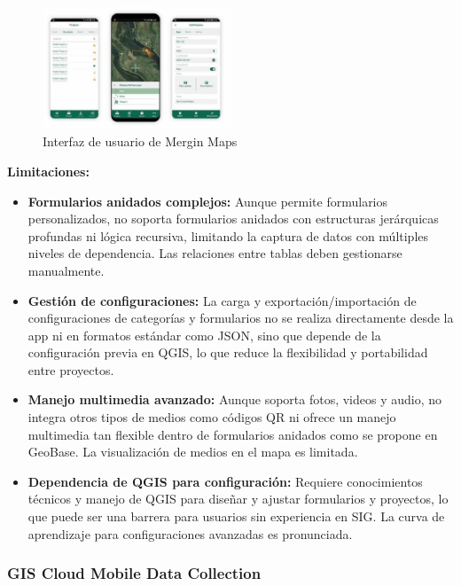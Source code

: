 \documentclass{article}
\begin{document}
\begin{figure}[h]
  \centering
  \includegraphics[width=0.5\textwidth]{images/mergin.jpeg}
  \caption{Interfaz de usuario de Mergin Maps}
  \label{fig:merginform}
\end{figure}

\textbf{Limitaciones:}
\begin{itemize}
  \item \textbf{Formularios anidados complejos:} Aunque permite formularios personalizados, no soporta formularios anidados con estructuras jerárquicas profundas ni lógica recursiva, limitando la captura de datos con múltiples niveles de dependencia. Las relaciones entre tablas deben gestionarse manualmente.
  
  \item \textbf{Gestión de configuraciones:} La carga y exportación/importación de configuraciones de categorías y formularios no se realiza directamente desde la app ni en formatos estándar como JSON, sino que depende de la configuración previa en QGIS, lo que reduce la flexibilidad y portabilidad entre proyectos.
  
  \item \textbf{Manejo multimedia avanzado:} Aunque soporta fotos, videos y audio, no integra otros tipos de medios como códigos QR ni ofrece un manejo multimedia tan flexible dentro de formularios anidados como se propone en GeoBase. La visualización de medios en el mapa es limitada.
  
  \item \textbf{Dependencia de QGIS para configuración:} Requiere conocimientos técnicos y manejo de QGIS para diseñar y ajustar formularios y proyectos, lo que puede ser una barrera para usuarios sin experiencia en SIG. La curva de aprendizaje para configuraciones avanzadas es pronunciada.
\end{itemize}

\subsubsection{GIS Cloud Mobile Data Collection}
\end{document}
